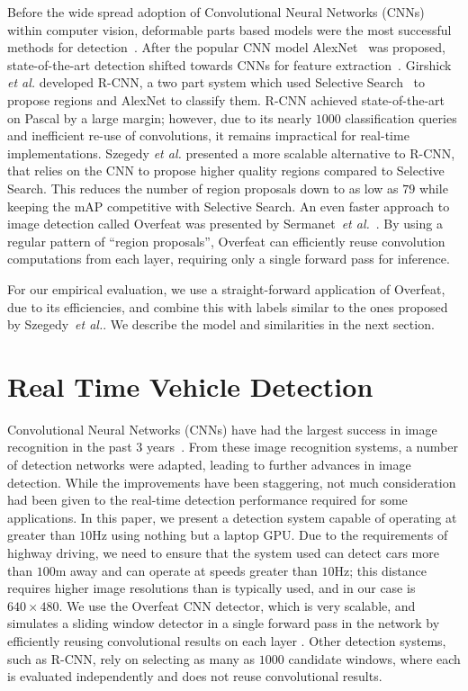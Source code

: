 \documentclass[journal]{IEEEtran}
\begin{document}
Before the wide spread adoption of Convolutional Neural Networks (CNNs) within computer vision, deformable parts based models were the most successful methods for detection~\cite{felzenszwalb-2010}. After the popular CNN model AlexNet~\cite{krizhevsky-2012} was proposed, state-of-the-art detection shifted towards CNNs for feature extraction~\cite{sermanet-2013,szegedy-2014,szegedy-2013,girshick-2014}. Girshick \textit{et al.} developed R-CNN, a two part system which used Selective Search~\cite{uijlings-2013} to propose regions and AlexNet to classify them. R-CNN achieved state-of-the-art on Pascal by a large margin; however, due to its nearly $1000$ classification queries and inefficient re-use of convolutions, it remains impractical for real-time implementations. Szegedy \textit{et al.} presented a more scalable alternative to R-CNN, that relies on the CNN to propose higher quality regions compared to Selective Search. This reduces the number of region proposals down to as low as $79$ while keeping the mAP competitive with Selective Search. An even faster approach to image detection called Overfeat was presented by Sermanet~\textit{et al.}~\cite{sermanet-2013}. By using a regular pattern of ``region proposals'', Overfeat can efficiently reuse convolution computations from each layer, requiring only a single forward pass for inference.

For our empirical evaluation, we use a straight-forward application of Overfeat, due to its efficiencies, and combine this with labels similar to the ones proposed by Szegedy~\textit{et al.}. We describe the model and similarities in the next section.

\section{Real Time Vehicle Detection}
Convolutional Neural Networks (CNNs) have had the largest success in image recognition in the past 3 years~\cite{krizhevsky-2012,szegedy-2014-inception,he-2015,simonyan-2014}. From these image recognition systems, a number of detection networks were adapted, leading to further advances in image detection. While the improvements have been staggering, not much consideration had been given to the real-time detection performance required for some applications. In this paper, we present a detection system capable of operating at greater than $10$Hz using nothing but a laptop GPU. Due to the requirements of highway driving, we need to ensure that the system used can detect cars more than $100$m away and can operate at speeds greater than $10$Hz; this distance requires higher image resolutions than is typically used, and in our case is $640 \times 480$. We use the Overfeat CNN detector, which is very scalable, and simulates a sliding window detector in a single forward pass in the network by efficiently reusing convolutional results on each layer \cite{sermanet-2013}. Other detection systems, such as R-CNN, rely on selecting as many as $1000$ candidate windows, where each is evaluated independently and does not reuse convolutional results.
\end{document}
